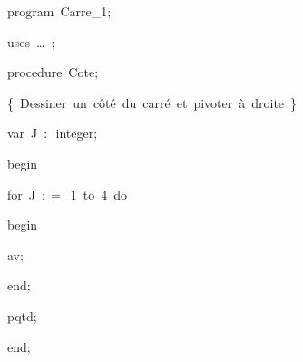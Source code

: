 
{
\parindent {}
\medskip

\carrenoir
\vspace{\neglskip}\mbox{\blc  \idt  \mcl program\idt \ Carre\_1$;$
}\par 
\vspace{\neglskip}\mbox{\blc \blk\idt \mcl uses\idt \ \ldots\ $;$
}\par 
\medskip

\pagebreak[3] 
\vspace{\neglskip}\mbox{\blc  \blk\idt  \mcl procedure\idt \ Cote$;$}\par 
\vspace{\neglskip}\mbox{\blc  \blk\blk\idt  \cmt  \{\ Dessiner\ un\ côté\ du\ carré\ et\ pivoter\ à\ droite\ \}\idt }\par 
\pagebreak[3] 
\vspace{\neglskip}\mbox{\blc  \blk\blk\idt  \mcl var\idt \ J\ $:$\ integer$;$}\par 
\vspace{\neglskip}\mbox{\blc  \blk\idt  \mcl begin\idt }\par 
\pagebreak[3] 
\vspace{\neglskip}\mbox{\blc  \blk\blk\idt  \mcl for\idt \ J\ $:$$=$\ 1\ \mcl to\idt \ 4\ \mcl do\idt }\par 
\vspace{\neglskip}\mbox{\blc  \blk\blk\blk\idt  \mcl begin\idt }\par 
\vspace{\neglskip}\mbox{\blc  \blk\blk\blk\blk\idt  av$;$\ }\par 
\vspace{\neglskip}\mbox{\blc  \blk\blk\blk\idt  \mcl end\idt $;$}\par 
\vspace{\neglskip}\mbox{\blc  \blk\blk\idt  pqtd$;$\ }\par 
\vspace{\neglskip}\mbox{\blc  \blk\idt  \mcl end\idt $;$}\par 
\medskip

}
